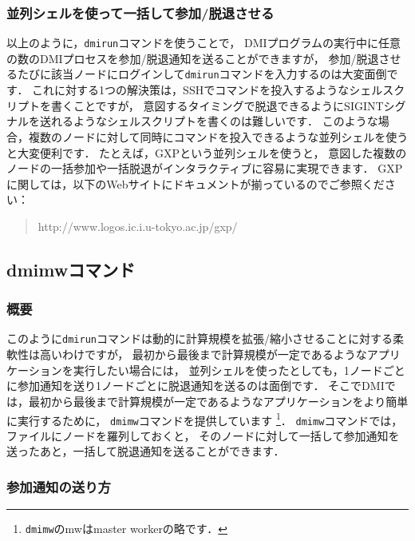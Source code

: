 \documentclass[report,12pt]{jsbook}
\begin{document}
\subsubsection{並列シェルを使って一括して参加/脱退させる}

以上のように，\texttt{dmirun}コマンドを使うことで，
DMIプログラムの実行中に任意の数のDMIプロセスを参加/脱退通知を送ることができますが，
参加/脱退させるたびに該当ノードにログインして\texttt{dmirun}コマンドを入力するのは大変面倒です．
これに対する1つの解決策は，SSHでコマンドを投入するようなシェルスクリプトを書くことですが，
意図するタイミングで脱退できるようにSIGINTシグナルを送れるようなシェルスクリプトを書くのは難しいです．
このような場合，複数のノードに対して同時にコマンドを投入できるような並列シェルを使うと大変便利です．
たとえば，GXPという並列シェルを使うと，
意図した複数のノードの一括参加や一括脱退がインタラクティブに容易に実現できます．
GXPに関しては，以下のWebサイトにドキュメントが揃っているのでご参照ください：

\begin{quote}
  http://www.logos.ic.i.u-tokyo.ac.jp/gxp/
\end{quote}



\subsection{dmimwコマンド}

\subsubsection{概要}

このように\texttt{dmirun}コマンドは動的に計算規模を拡張/縮小させることに対する柔軟性は高いわけですが，
最初から最後まで計算規模が一定であるようなアプリケーションを実行したい場合には，
並列シェルを使ったとしても，1ノードごとに参加通知を送り1ノードごとに脱退通知を送るのは面倒です．
そこでDMIでは，最初から最後まで計算規模が一定であるようなアプリケーションをより簡単に実行するために，
\texttt{dmimw}コマンドを提供しています
\footnote{\texttt{dmimw}のmwはmaster workerの略です．}．
\texttt{dmimw}コマンドでは，ファイルにノードを羅列しておくと，
そのノードに対して一括して参加通知を送ったあと，一括して脱退通知を送ることができます．

\subsubsection{参加通知の送り方}
\end{document}
